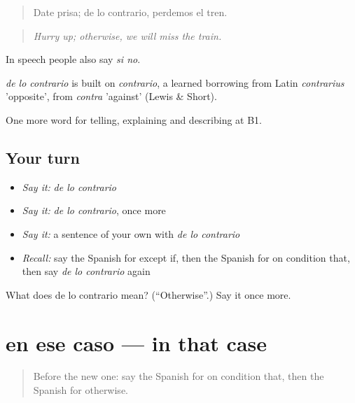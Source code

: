 \begin{quote}
Date prisa; de lo contrario, perdemos el tren.
\end{quote}

\begin{quote}
\emph{Hurry up; otherwise, we will miss the train.}
\end{quote}

In speech people also say \emph{si no}.

\begin{cousinweb}
\emph{de lo contrario} is built on \emph{contrario}, a learned borrowing from Latin \emph{contrarius} 'opposite', from \emph{contra} 'against' (Lewis \& Short).
\end{cousinweb}

\begin{grammarlens}[title={What you've built}]
One more word for telling, explaining and describing at B1.
\end{grammarlens}

\subsection*{Your turn}
\begin{itemize}
\raggedright
  \item \emph{Say it:} \emph{de lo contrario}
  \item \emph{Say it:} \emph{de lo contrario}, once more
  \item \emph{Say it:} a sentence of your own with \emph{de lo contrario}
  \item \emph{Recall:} say the Spanish for except if, then the Spanish for on condition that, then say \emph{de lo contrario} again
\end{itemize}

\begin{tcolorbox}[breakable,colback=teal!4,colframe=teal!35!black,title={Before you move on}]
What does de lo contrario mean? (\textquotedblleft{}Otherwise\textquotedblright{}.) Say it once more.
\end{tcolorbox}
\section[en ese caso]{en ese caso — in that case}

\label{lesson:ES-C612-en-ese-caso}



\begin{quote}
Before the new one: say the Spanish for on condition that, then the Spanish for otherwise.
\end{quote}

